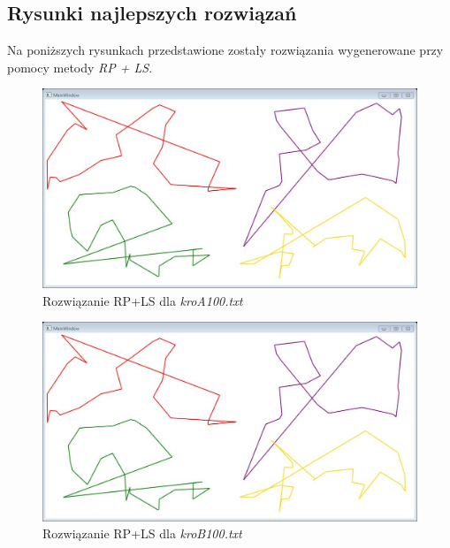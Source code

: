 \documentclass{article}
\begin{document}
\subsection{Rysunki najlepszych rozwiązań}
Na poniższych rysunkach przedstawione zostały rozwiązania wygenerowane przy pomocy metody \emph{RP + LS}.
\begin{figure}[h!]
\centering\includegraphics[width=17cm]{img/rys2.png}
\caption{Rozwiązanie RP+LS dla \emph{kroA100.txt}}
\end{figure}
\begin{figure}[h!]
\centering\includegraphics[width=17cm]{img/rys3.png}
\caption{Rozwiązanie RP+LS dla \emph{kroB100.txt}}
\end{figure}
\end{document}
